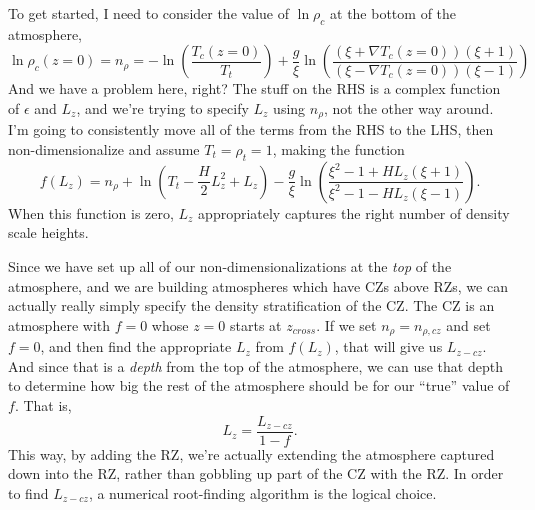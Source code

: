 \documentclass[aps, pre, onecolumn, nofootinbib, notitlepage, groupedaddress, amsfonts, amssymb, amsmath, longbibliography]{revtex4-1}
\newcommand{\grad}{\ensuremath{\nabla}}
\begin{document}
To get started, I need to consider the value of $\ln\rho_c$ at the bottom of the atmosphere,
$$
\ln\rho_c(z=0) = n_\rho = -\ln\left(\frac{T_c(z=0)}{T_t}\right)
+ \frac{g}{\xi}\ln\left(\frac{(\xi + \grad T_c(z=0))(\xi + 1)}{(\xi - \grad T_c(z=0))(\xi - 1)}\right)
$$
And we have a problem here, right?  The stuff on the RHS is a complex function of $\epsilon$ and
$L_z$, and we're trying to specify $L_z$ using $n_\rho$, not the other way around.
I'm going to consistently move all of the terms from the RHS to the LHS, then
non-dimensionalize and assume $T_t = \rho_t = 1$, making the function
\begin{equation}
f(L_{z}) = n_\rho + \ln\left(T_t - \frac{H}{2}L_z^2 + L_z\right) - 
\frac{g}{\xi}\ln\left(\frac{\xi^2 - 1 + HL_z(\xi + 1)}{\xi^2 - 1 - HL_z(\xi - 1)}\right).
\end{equation}
When this function is zero, $L_z$ appropriately captures the right number of density scale heights.

Since we have set up all of our non-dimensionalizations at the \emph{top} of the atmosphere, and we
are building atmospheres which have CZs above RZs, we can actually really simply specify the
density stratification of the CZ.  The CZ is an atmosphere with $f = 0$ whose $z = 0$ starts
at $z_{cross}$.  If we set $n_\rho = n_{\rho, cz}$ and set $f = 0$, and then find the appropriate
$L_z$ from $f(L_z)$, that will give us $L_{z-cz}$.  And since that is a \emph{depth} from
the top of the atmosphere, we can use that depth to determine how big the rest of the
atmosphere should be for our ``true'' value of $f$. That is,
\begin{equation}
L_z = \frac{L_{z-cz}}{1 - f}.
\end{equation}
This way, by adding the RZ, we're actually extending the atmosphere captured down into the RZ,
rather than gobbling up part of the CZ with the RZ.  In order to find $L_{z-cz}$, a
numerical root-finding algorithm is the logical choice.
\end{document}
